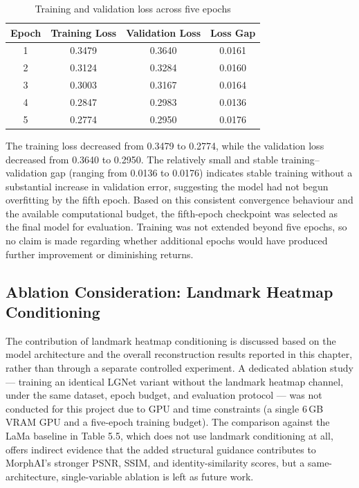 \begin{table}[H]
\centering
\renewcommand{\arraystretch}{1.2}
\begin{tabular}{|c|c|c|c|}
\hline
\textbf{Epoch} & \textbf{Training Loss} & \textbf{Validation Loss} &
\textbf{Loss Gap} \\ \hline
1 & 0.3479 & 0.3640 & 0.0161 \\ \hline
2 & 0.3124 & 0.3284 & 0.0160 \\ \hline
3 & 0.3003 & 0.3167 & 0.0164 \\ \hline
4 & 0.2847 & 0.2983 & 0.0136 \\ \hline
5 & 0.2774 & 0.2950 & 0.0176 \\ \hline
\end{tabular}
\caption{Training and validation loss across five epochs}
\label{tab:training_loss}
\end{table}

\noindent The training loss decreased from 0.3479 to 0.2774, while the
validation loss decreased from 0.3640 to 0.2950. The relatively small and
stable training--validation gap (ranging from 0.0136 to 0.0176) indicates
stable training without a substantial increase in validation error,
suggesting the model had not begun overfitting by the fifth epoch. Based
on this consistent convergence behaviour and the available computational
budget, the fifth-epoch checkpoint was selected as the final model for
evaluation. Training was not extended beyond five epochs, so no claim is
made regarding whether additional epochs would have produced further
improvement or diminishing returns.

\subsection{Ablation Consideration: Landmark Heatmap Conditioning}
The contribution of landmark heatmap conditioning is discussed based on the model 
architecture and the overall reconstruction results reported in this chapter, rather 
than through a separate controlled experiment. A dedicated ablation study — training 
an identical LGNet variant without the landmark heatmap channel, under the same 
dataset, epoch budget, and evaluation protocol — was not conducted for this project 
due to GPU and time constraints (a single 6\,GB VRAM GPU and a five-epoch training 
budget). The comparison against the LaMa baseline in Table 5.5, which does not use 
landmark conditioning at all, offers indirect evidence that the added structural 
guidance contributes to MorphAI's stronger PSNR, SSIM, and identity-similarity scores, 
but a same-architecture, single-variable ablation is left as future work.

